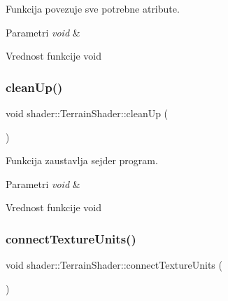 Funkcija povezuje sve potrebne atribute. 


\begin{DoxyParams}{Parametri}
{\em void} & \\
\hline
\end{DoxyParams}
\begin{DoxyReturn}{Vrednost funkcije}
void 
\end{DoxyReturn}
\mbox{\label{classshader_1_1TerrainShader_a98782288fa07057e24ab2a88e0020e03}} 
\subsubsection{\texorpdfstring{clean\+Up()}{cleanUp()}}
{\footnotesize\ttfamily void shader\+::\+Terrain\+Shader\+::clean\+Up (\begin{DoxyParamCaption}\item[{void}]{ }\end{DoxyParamCaption})}



Funkcija zaustavlja sejder program. 


\begin{DoxyParams}{Parametri}
{\em void} & \\
\hline
\end{DoxyParams}
\begin{DoxyReturn}{Vrednost funkcije}
void 
\end{DoxyReturn}
\mbox{\label{classshader_1_1TerrainShader_aa4317635c2194f8a6fbfe08dffeaedfd}} 
\subsubsection{\texorpdfstring{connect\+Texture\+Units()}{connectTextureUnits()}}
{\footnotesize\ttfamily void shader\+::\+Terrain\+Shader\+::connect\+Texture\+Units (\begin{DoxyParamCaption}{ }\end{DoxyParamCaption})}



